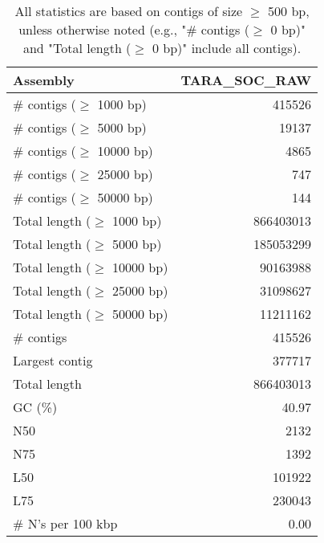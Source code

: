 \documentclass[12pt,a4paper]{article}
\begin{document}
\begin{table}[ht]
\begin{center}
\caption{All statistics are based on contigs of size $\geq$ 500 bp, unless otherwise noted (e.g., "\# contigs ($\geq$ 0 bp)" and "Total length ($\geq$ 0 bp)" include all contigs).}
\begin{tabular}{|l*{1}{|r}|}
\hline
Assembly & TARA\_SOC\_RAW \\ \hline
\# contigs ($\geq$ 1000 bp) & 415526 \\ \hline
\# contigs ($\geq$ 5000 bp) & 19137 \\ \hline
\# contigs ($\geq$ 10000 bp) & 4865 \\ \hline
\# contigs ($\geq$ 25000 bp) & 747 \\ \hline
\# contigs ($\geq$ 50000 bp) & 144 \\ \hline
Total length ($\geq$ 1000 bp) & 866403013 \\ \hline
Total length ($\geq$ 5000 bp) & 185053299 \\ \hline
Total length ($\geq$ 10000 bp) & 90163988 \\ \hline
Total length ($\geq$ 25000 bp) & 31098627 \\ \hline
Total length ($\geq$ 50000 bp) & 11211162 \\ \hline
\# contigs & 415526 \\ \hline
Largest contig & 377717 \\ \hline
Total length & 866403013 \\ \hline
GC (\%) & 40.97 \\ \hline
N50 & 2132 \\ \hline
N75 & 1392 \\ \hline
L50 & 101922 \\ \hline
L75 & 230043 \\ \hline
\# N's per 100 kbp & 0.00 \\ \hline
\end{tabular}
\end{center}
\end{table}
\end{document}
